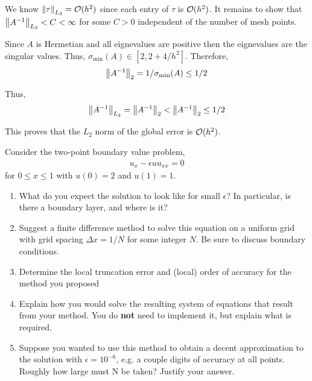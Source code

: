 \documentclass[10pt]{article}
\begin{document}
\begin{solution}[Solution]
\begin{enumerate}[label=(\alph*), nolistsep]
We know \( \left\lVert\tau\right\rVert_{L_2} = \mathcal{O}(h^2) \) since each entry of \( \tau \) is \( \mathcal{O}(h^2) \). It remains to show that \( \left\lVert A^{-1}\right\rVert_{L_2} < C < \infty \) for some \( C>0 \) independent of the number of mesh points.

Since \( A \) is Hermetian and all eignevalues are positive then the eignevalues are the singular values. Thus, \( \sigma_\text{min}(A) \in [2,2+4/h^2] \). Therefore,
\begin{align*}
    \left\lVert A^{-1}\right\rVert_2 = 1/\sigma_\text{min}(A) \leq 1/2
\end{align*}

Thus,
\begin{align*}
    \left\lVert A^{-1}\right\rVert_{L_2} = \left\lVert A^{-1}\right\rVert_2 <  \left\lVert A^{-1}\right\rVert_2 \leq 1/2
\end{align*}

This proves that the \( L_2 \) norm of the global error is \( \mathcal{O}(h^2) \).

\end{enumerate}
\end{solution}





\begin{problem}
Consider the two-point boundary value problem,
\begin{align*}
    u_x - \epsilon u u_{xx} = 0
\end{align*}
for \( 0\leq x\leq 1 \) with \( u(0)=2 \) and \( u(1)=1 \).
\begin{enumerate}[label=(\alph*),nolistsep]
    \item What do you expect the solution to look like for small \( \epsilon \)? In particular, is there a boundary layer, and where is it?
    \item Suggest a finite difference method to solve this equation on a uniform grid with grid
spacing \( \Delta x = 1/N \) for some integer \( N \). Be sure to discuss boundary conditions.
    \item Determine the local truncation error and (local) order of accuracy for the method
you proposed
    \item Explain how you would solve the resulting system of equations that result from your method. You do \textbf{not} need to implement it, but explain what is required.
    \item Suppose you wanted to use this method to obtain a decent approximation to the solution with \( \epsilon = 10^{-6} \), e.g. a couple digits of accuracy at all points. Roughly how large must N be taken? Justify your answer.
\end{enumerate}
\end{problem}
\end{document}
